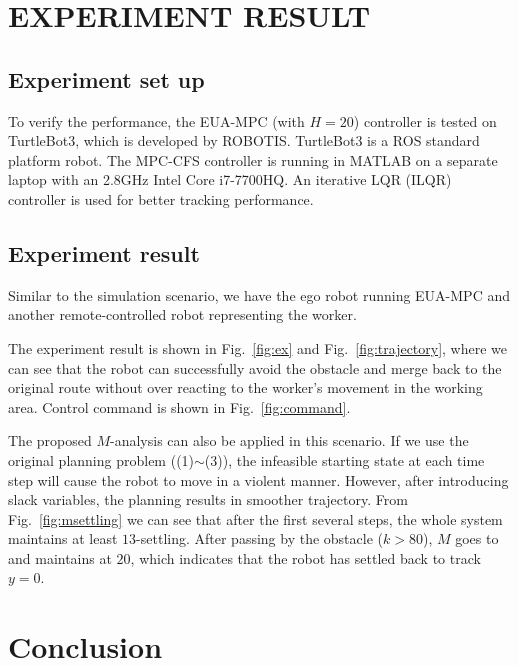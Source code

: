 \documentclass[letterpaper, 10 pt, conference]{ieeeconf}  %
\begin{document}
\section{EXPERIMENT RESULT}


\subsection{Experiment set up}
To verify the performance, the EUA-MPC (with $H=20$) controller is tested on TurtleBot3, which is  developed by ROBOTIS. TurtleBot3 is a ROS standard platform robot. The MPC-CFS controller is running in MATLAB on a separate laptop with an 2.8GHz Intel Core i7-7700HQ. An iterative LQR (ILQR) controller \cite{tassa2012synthesis} is used for better tracking performance.

\subsection{Experiment result}
Similar to the simulation scenario, we have the ego robot running EUA-MPC and another remote-controlled robot representing the worker.

The experiment result is shown in Fig.~\ref{fig:ex} and Fig.~\ref{fig:trajectory}, where we can see that the robot can successfully avoid the obstacle and merge back to the original route without over reacting to the worker's movement in the working area. Control command is shown in Fig.~\ref{fig:command}.

The proposed $M$-analysis can also be applied in this scenario. If we use the original planning problem ((1)$\sim$(3)), the infeasible starting state at each time step will cause the robot to move in a violent manner. However, after introducing slack variables, the planning results in smoother trajectory. From Fig.~\ref{fig:msettling} we can see that after the first several steps, the whole system maintains at least $13$-settling. After passing by the obstacle ($k>80$), $M$ goes to and maintains at $20$, which indicates that the robot has settled back to track $y=0$. 


\section{Conclusion}
\end{document}
